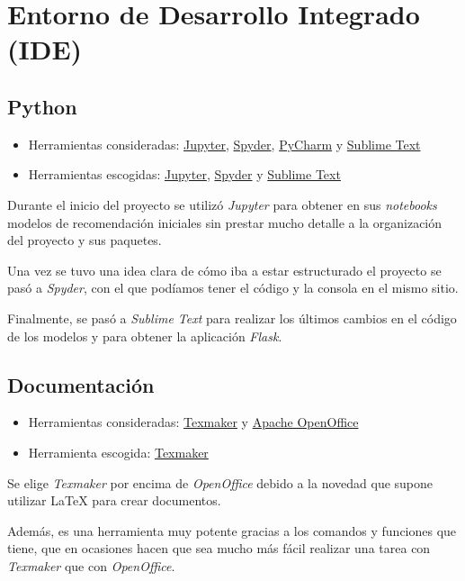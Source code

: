 \section{Entorno de Desarrollo Integrado (IDE)}\label{ide}
\subsection{Python}\label{python}
\begin{itemize}
\tightlist
\item Herramientas consideradas: 
	\href{https://jupyter.org/}{Jupyter}, 
	\href{https://www.spyder-ide.org/}{Spyder}, 
	\href{https://www.jetbrains.com/pycharm/}{PyCharm} y
	\href{https://www.sublimetext.com/}{Sublime Text}
\item Herramientas escogidas:
	\href{https://jupyter.org/}{Jupyter},
	\href{https://www.spyder-ide.org/}{Spyder} y 
	\href{https://www.sublimetext.com/}{Sublime Text}
\end{itemize}
Durante el inicio del proyecto se utilizó \textit{Jupyter} para obtener en sus \textit{notebooks} modelos de recomendación iniciales sin prestar mucho detalle a la organización del proyecto y sus paquetes.

Una vez se tuvo una idea clara de cómo iba a estar estructurado el proyecto se pasó a \textit{Spyder}, con el que podíamos tener el código y la consola en el mismo sitio.

Finalmente, se pasó a \textit{Sublime Text} para realizar los últimos cambios en el código de los modelos y para obtener la aplicación \textit{Flask}.

\subsection{Documentación}\label{documentacion}
\begin{itemize}
\tightlist
\item Herramientas consideradas: 
	\href{http://www.xm1math.net/texmaker/}{Texmaker} y
	\href{https://www.openoffice.org/es/}{Apache OpenOffice}
\item Herramienta escogida:
	\href{http://www.xm1math.net/texmaker/}{Texmaker}
\end{itemize}
Se elige \textit{Texmaker} por encima de \textit{OpenOffice} debido a la novedad que supone utilizar \LaTeX{} \cite{wiki:latex} para crear documentos. 

Además, es una herramienta muy potente gracias a los comandos y funciones que tiene, que en ocasiones hacen que sea mucho más fácil realizar una tarea con \textit{Texmaker} que con \textit{OpenOffice}.

